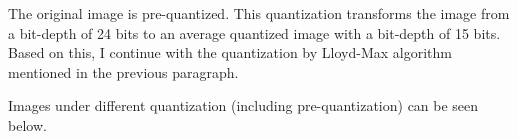 \documentclass{article}
\begin{document}
The original image is pre-quantized. This quantization transforms the image from a bit-depth of 24 bits to an average quantized image with a bit-depth of 15 bits. Based on this, I continue with the quantization by Lloyd-Max algorithm mentioned in the previous paragraph.

Images under different quantization (including pre-quantization) can be seen below.

\begin{figure}[!h]
	\centering
	\hspace{0 pt}
	\hspace{0 pt}
	\hspace{0 pt}
	\hspace{0 pt}

\end{figure}
\end{document}
